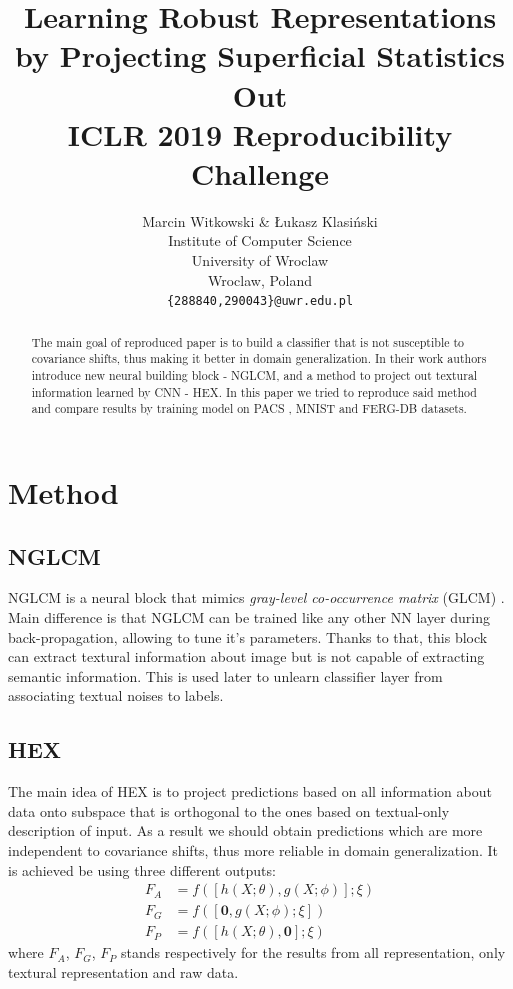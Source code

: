 \documentclass{article} %
\title{Learning Robust Representations by Projecting Superficial Statistics Out \\ ICLR 2019 Reproducibility Challenge}
\author{Marcin Witkowski \& Łukasz Klasiński \\
Institute of Computer Science \\
University of Wroclaw \\
Wroclaw, Poland \\
\texttt{\{288840,290043\}@uwr.edu.pl} \\
}
\begin{document}
\maketitle

\begin{abstract}
The main goal of reproduced paper is to build a classifier that is not susceptible to covariance shifts, thus making it better in domain generalization. In their work authors introduce new neural building
block - NGLCM, and a method to project out textural information learned by CNN - HEX. In this
paper we tried to reproduce said method and compare results by training model on PACS \citep{Li2017dg}, MNIST and FERG-DB \citep{aneja2016modeling} 
datasets.

\end{abstract}

\section{Method}

\subsection{NGLCM}

NGLCM is a neural block that mimics \textit{gray-level co-occurrence matrix} (GLCM) \citep{glcm}. Main difference is that NGLCM can be trained like any other NN layer during back-propagation, allowing
to tune it's parameters. Thanks to that, this block can extract textural 
information about image but is not capable of extracting semantic information. This is used later to 
unlearn classifier layer from associating textual noises to labels. 

\subsection{HEX}

The main idea of HEX is to project predictions based on all information about data onto subspace that is orthogonal to the ones based on textual-only description of input.
As a result we should obtain predictions which are more independent to covariance shifts, thus more reliable
in domain generalization. It is achieved be using three different outputs:
\begin{align*}
F_A & = f([h(X;\theta), g(X;\phi)];\xi) \\
F_G & = f([\mathbf{0}, g(X;\phi);\xi]) \\
F_P & = f([h(X;\theta), \mathbf{0}];\xi)
\end{align*}
where $F_A$, $F_G$, $F_P$ stands respectively for the results from all representation, only textural representation and raw data.
\end{document}

